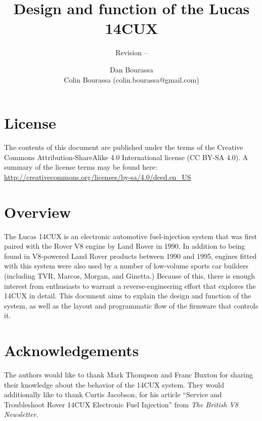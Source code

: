\documentclass[11pt,twocolumn]{scrartcl}
\begin{document}
\setlength{\abovecaptionskip}{3pt}
\setlength{\belowcaptionskip}{10pt}


\begin{multicols}{2}
\title{Design and function of the Lucas 14CUX}
\subtitle{Revision --}
\author{
	Dan Bourassa \\
	Colin Bourassa (colin.bourassa@gmail.com)\\
    }
\date{}
\maketitle
\end{multicols}

\section {License}
The contents of this document are published under the terms of the Creative Commons Attribution-ShareAlike 4.0 International license (CC BY-SA 4.0). A summary of the license terms may be found here: \url{http://creativecommons.org/licenses/by-sa/4.0/deed.en_US}

\section {Overview}
The Lucas 14CUX is an electronic automotive fuel-injection system that was first paired with the Rover V8 engine by Land Rover in 1990. In addition to being found in V8-powered Land Rover products between 1990 and 1995, engines fitted with this system were also used by a number of low-volume sports car builders (including TVR, Marcos, Morgan, and Ginetta.) Because of this, there is enough interest from enthusiasts to warrant a reverse-engineering effort that explores the 14CUX in detail. This document aims to explain the design and function of the system, as well as the layout and programmatic flow of the firmware that controls it.

\section {Acknowledgements}
The authors would like to thank Mark Thompson and Franc Buxton for sharing their knowledge about the behavior of the 14CUX system. They would additionally like to thank Curtis Jacobson, for his article ``Service and Troubleshoot Rover 14CUX Electronic Fuel Injection'' from {\em The British V8 Newsletter}.
\end{document}
